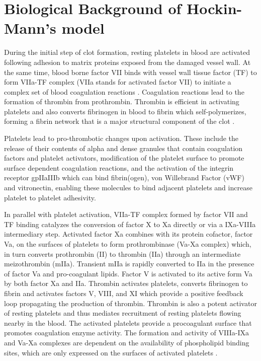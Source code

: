 \section*{Biological Background of Hockin-Mann's model}
\label{sec:back}


During the initial step of clot formation, resting platelets in
blood are activated following adhesion to matrix proteins exposed
from the damaged vessel wall. At the same time, blood borne factor
VII binds with vessel wall tissue factor (TF) to form VIIa-TF
complex (VIIa stands for activated factor VII) to initiate a complex
set of blood coagulation reactions \cite{Nem92}. Coagulation
reactions lead to the formation of thrombin from prothrombin.
Thrombin is efficient in activating platelets and also converts
fibrinogen in blood to fibrin which self-polymerizes, forming a
fibrin network that is a major
structural component of the clot \cite{HWL,LSK}. %

Platelets lead to pro-thrombotic changes upon activation. These
include the release of their contents of alpha and dense granules
that contain coagulation factors and platelet activators,
modification of the platelet surface to promote surface dependent
coagulation reactions, and the activation of the integrin receptor
gpIIaIIIb which can bind fibrin(ogen), von Willebrand Factor (vWF)
and vitronectin, enabling these molecules to bind adjacent platelets
and increase platelet to platelet adhesivity.


In parallel with platelet activation, VIIa-TF complex formed by
factor VII and TF binding catalyzes the conversion of factor X to Xa
directly or via a IXa-VIIIa intermediary step. Activated factor Xa
combines with its protein cofactor, factor Va, on the surfaces of
platelets to form prothrombinase (Va-Xa complex) which, in turn
converts prothrombin (II) to thrombin (IIa) through an intermediate
meizothrombin (mIIa). Transient mIIa is rapidly converted to IIa in
the presence of factor Va and pro-coagulant lipids. Factor V is
activated to its active form Va by both factor Xa and IIa. Thrombin
activates platelets, converts fibrinogen to fibrin and activates
factors V, VIII, and XI which provide a positive feedback loop
propagating the production of thrombin. Thrombin is also a potent
activator of resting platelets and thus mediates recruitment of
resting platelets flowing nearby in the blood. The activated
platelets provide a procoagulant surface that promotes coagulation
enzyme activity. The formation and activity of VIIIa-IXa and Va-Xa
complexes are dependent on the availability of phospholipid binding
sites, which are only expressed on the surfaces of activated
platelets \cite{AssHer06,BPM,HocJon02,KhaSem89,KF01,LSK}.


